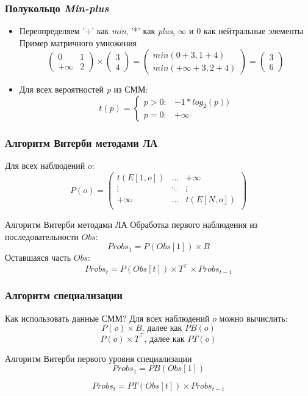 \documentclass{beamer}
\begin{document}
\begin{frame}[fragile]
	\frametitle{Полукольцо \emph{Min-plus}}
\begin{itemize}
	\item Переопределяем '+' как \emph{min}, '*' как  \emph{plus}, $\infty$ и $0$ как нейтральные элементы
	\vfill
	Пример матричного умножения
\[
  \begin{pmatrix}
    0 & 1 \\
    +\infty & 2
  \end{pmatrix}
  \times
  \begin{pmatrix}
    3 \\
    4
  \end{pmatrix}
  =
  \begin{pmatrix}
    min(0 + 3, 1 + 4) \\
    min(+\infty + 3, 2 + 4)
  \end{pmatrix}
  =
  \begin{pmatrix}
    3 \\
    6
  \end{pmatrix}
\]
\vfill
\item Для всех вероятностей \emph{p} из СММ:
\[  t(p) =
    \begin{cases}
      p > 0: & -1 * log_{2}(p))\\
      p = 0: & +\infty
    \end{cases}       
\]
\end{itemize}
\end{frame}


\begin{frame}[fragile]
	\frametitle{Алгоритм Витерби методами ЛА}
	Для всех наблюдений $o$:
\[
  P(o) =
  \begin{pmatrix}
    t(E[1,o]) & \hdots & +\infty \\
    \vdots & \ddots & \vdots\\
    +\infty & \hdots & t(E[N,o]) \\
  \end{pmatrix}
\]
	\vfill
	\begin{block}{Алгоритм Витерби методами ЛА}
		Обработка первого наблюдения из последовательности $Obs$:
		\[\mathit{Probs}_{1} = P(\mathit{Obs[1]}) \times B\]
		Оставшаяся часть $Obs$:
	\[\mathit{Probs}_{t} = P(\mathit{Obs[t]}) \times T^{\top} \times \mathit{Probs}_{t - 1}\]	
	\end{block}
\end{frame}


\begin{frame}[fragile]
	\frametitle{Алгоритм специализации}
	Как использовать данные СММ?
	\vfill
	Для всех наблюдений $o$ можно вычислить: 
	\[P(\mathit{o}) \times B \text{, далее как } PB(o)\]
	\[P(\mathit{o}) \times T^{\top} \text{, далее как } PT(o)\] 
	\vfill
	\begin{block}{Алгоритм Витерби первого уровня специализации}
		\[\mathit{Probs}_{1} = PB(Obs[1])\]
	
		\[\mathit{Probs}_{t} = PT(Obs[t]) \times \mathit{Probs}_{t - 1}\]

	\end{block}
\end{frame}
\end{document}
